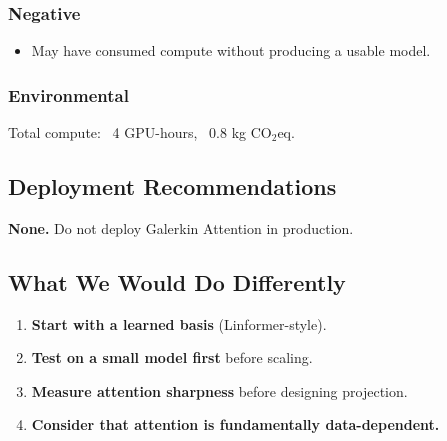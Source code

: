\subsubsection{Negative}

\begin{itemize}
\item May have consumed compute without producing a usable model.

\end{itemize}
\subsubsection{Environmental}

Total compute: ~4 GPU-hours, ~0.8 kg CO$_2$eq.

\subsection{Deployment Recommendations}

\textbf{None.} Do not deploy Galerkin Attention in production.

\subsection{What We Would Do Differently}

\begin{enumerate}
\item \textbf{Start with a learned basis} (Linformer-style).
\item \textbf{Test on a small model first} before scaling.
\item \textbf{Measure attention sharpness} before designing projection.
\item \textbf{Consider that attention is fundamentally data-dependent.}

\end{enumerate}
